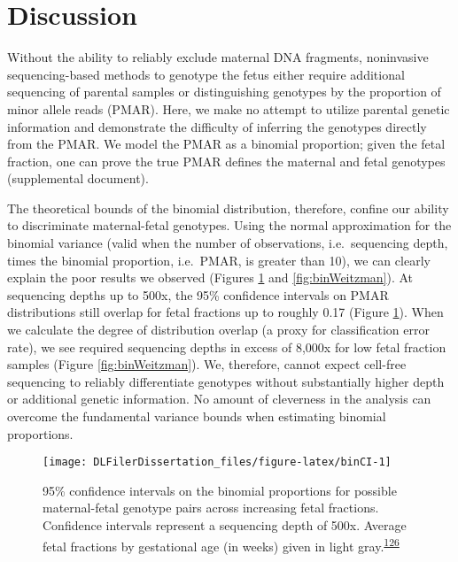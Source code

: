 \documentclass[11pt,letterpaper,oneside]{book}
\begin{document}
\hypertarget{discussion-1}{%
\section{Discussion}\label{discussion-1}}

Without the ability to reliably exclude maternal DNA fragments, noninvasive sequencing-based methods to genotype the fetus either require additional sequencing of parental samples or distinguishing genotypes by the proportion of minor allele reads (PMAR).
Here, we make no attempt to utilize parental genetic information and demonstrate the difficulty of inferring the genotypes directly from the PMAR.
We model the PMAR as a binomial proportion; given the fetal fraction, one can prove the true PMAR defines the maternal and fetal genotypes (supplemental document).

The theoretical bounds of the binomial distribution, therefore, confine our ability to discriminate maternal-fetal genotypes.
Using the normal approximation for the binomial variance (valid when the number of observations, i.e.~sequencing depth, times the binomial proportion, i.e.~PMAR, is greater than 10), we can clearly explain the poor results we observed (Figures \ref{fig:binCI} and \ref{fig:binWeitzman}).
At sequencing depths up to 500x, the 95\% confidence intervals on PMAR distributions still overlap for fetal fractions up to roughly 0.17 (Figure \ref{fig:binCI}).
When we calculate the degree of distribution overlap (a proxy for classification error rate), we see required sequencing depths in excess of 8,000x for low fetal fraction samples (Figure \ref{fig:binWeitzman}).
We, therefore, cannot expect cell-free sequencing to reliably differentiate genotypes without substantially higher depth or additional genetic information.
No amount of cleverness in the analysis can overcome the fundamental variance bounds when estimating binomial proportions.





\begin{figure}

{\centering \texttt{[image: DLFilerDissertation\_files/figure-latex/binCI-1]} 

}

\caption[95\% confidence intervals on the binomial proportions for possible maternal-fetal genotype pairs.]{95\% confidence intervals on the binomial proportions for possible maternal-fetal genotype pairs across increasing fetal fractions. Confidence intervals represent a sequencing depth of 500x. Average fetal fractions by gestational age (in weeks) given in light gray.\textsuperscript{\protect\hyperlink{ref-kinnings:2015aa}{126}}}\label{fig:binCI}
\end{figure}
\end{document}
